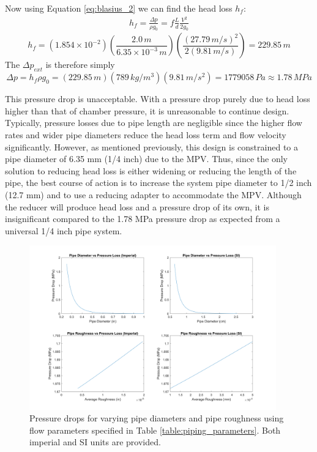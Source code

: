 \documentclass[9pt]{article} %
\numberwithin{equation}{section} %
\begin{document}
Now using Equation \ref{eq:blasius_2} we can find the head loss $h_{f}$:
\begin{align*}
h_{f} = \frac{\Delta p}{\rho g_{0}} = f \frac{L}{d} \frac{V^{2}}{2g_{0}}
\end{align*}
\begin{equation*}
h_{f} = (1.854 \times 10^{-2}) \left( \frac{2.0\, m}{6.35 \times 10^{-3}\, m} \right) \left( \frac{(27.79\, m/s)^{2}}{2 (9.81\, m/s)} \right) = 229.85 \, m
\end{equation*}
The $\Delta p_{ext}$ is therefore simply
\begin{equation*}
\Delta p = h_{f} \rho g_{0} = (229.85 \, m)(789 \, kg/m^{3})(9.81 \, m/s^{2}) = 1779058 \, Pa \approx 1.78 \, MPa
\end{equation*}

This pressure drop is unacceptable. With a pressure drop purely due to head loss higher than that of chamber pressure, it is unreasonable to continue design. Typically, pressure losses due to pipe length are negligible since the higher flow rates and wider pipe diameters reduce the head loss term and flow velocity significantly. However, as mentioned previously, this design is constrained to a pipe diameter of 6.35 mm (1/4 inch) due to the MPV. Thus, since the only solution to reducing head loss is either widening or reducing the length of the pipe, the best course of action is to increase the system pipe diameter to 1/2 inch (12.7 mm) and to use a reducing adapter to accommodate the MPV. Although the reducer will produce head loss and a pressure drop of its own, it is insignificant compared to the 1.78 MPa pressure drop as expected from a universal 1/4 inch pipe system.

\begin{figure}[!htb]
\centering
\includegraphics[scale=0.55, width=0.95\textwidth]{pipe_pressure_graphs.png}
\caption{Pressure drops for varying pipe diameters and pipe roughness using flow parameters specified in Table \ref{table:piping_parameters}. Both imperial and SI units are provided.}
\label{fig:pipe_pressure_graphs}
\end{figure}
\end{document}
